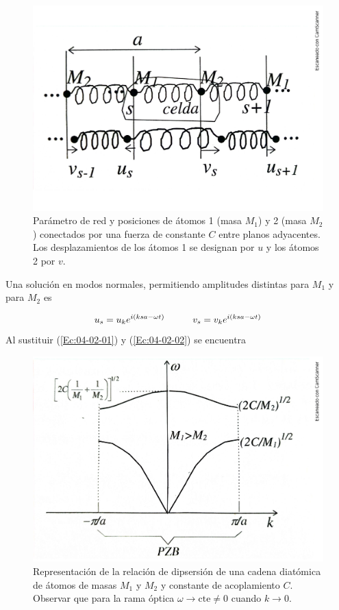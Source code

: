 \begin{figure}[h!] \centering
    \includegraphics[scale=0.4]{Cuerpo/Ch_04/Fotos libro 4.pdf}
    \caption{Parámetro de red y posiciones de átomos 1 (masa $M_1$) y 2 (masa $M_2$) conectados por una fuerza de constante $C$ entre planos adyacentes. Los desplazamientos de los átomos 1 se designan por $u$ y los átomos 2 por $v$.}
    \label{Fig:04-04}
\end{figure}    

Una solución en modos normales, permitiendo amplitudes distintas para $M_1$ y para $M_2$ es 

\begin{equation}
	u_s = u_k e^{i(ksa-\omega  t)} \quad \quad \quad v_s = v_k e^{i(ksa-\omega t)} \label{Ec:04-02-02}
\end{equation}
Al sustituir (\ref{Ec:04-02-01}) y (\ref{Ec:04-02-02}) se encuentra 



\begin{figure}[h!] \centering
    \includegraphics[scale=0.5]{Cuerpo/Ch_04/Fotos libro 5.pdf}
    \caption{Representación de la relación de dipsersión de una cadena diatómica de átomos de masas $M_1$ y $M_2$ y constante de acoplamiento $C$. Observar que para la rama óptica $\omega \rightarrow \text{cte} \neq 0$ cuando $k\rightarrow 0$.}
    \label{Fig:04-05}
\end{figure}    

